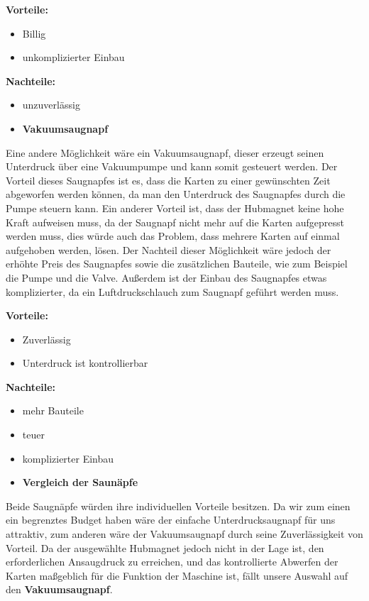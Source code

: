 \textbf{Vorteile:}
\begin{itemize}
    \item Billig
    \item unkomplizierter Einbau
\end{itemize}
\textbf{Nachteile:}
\begin{itemize}
    \item unzuverlässig
\end{itemize}

\begin{itemize}
    \item \textbf{Vakuumsaugnapf}
\end{itemize}
Eine andere Möglichkeit wäre ein Vakuumsaugnapf, dieser erzeugt seinen Unterdruck über eine Vakuumpumpe und kann somit gesteuert werden. Der Vorteil dieses Saugnapfes ist es, dass die Karten zu einer gewünschten Zeit abgeworfen werden können, da man den
Unterdruck des Saugnapfes durch die Pumpe steuern kann. Ein anderer Vorteil ist, dass der Hubmagnet keine hohe Kraft aufweisen muss, da der Saugnapf nicht mehr auf die Karten aufgepresst werden muss, dies würde auch das Problem, dass mehrere Karten auf einmal
aufgehoben werden, lösen. Der Nachteil dieser Möglichkeit wäre jedoch der erhöhte Preis des Saugnapfes sowie die zusätzlichen Bauteile, wie zum Beispiel die Pumpe und die Valve. Außerdem ist der Einbau des Saugnapfes etwas komplizierter, da ein Luftdruckschlauch
zum Saugnapf geführt werden muss.

\textbf{Vorteile:}
\begin{itemize}
    \item Zuverlässig
    \item Unterdruck ist kontrollierbar
\end{itemize}
\textbf{Nachteile:}
\begin{itemize}
    \item mehr Bauteile
    \item teuer
    \item komplizierter Einbau
\end{itemize}

\begin{itemize}
    \item \textbf{Vergleich der Saunäpfe}
\end{itemize}

Beide Saugnäpfe würden ihre individuellen Vorteile besitzen. Da wir zum einen ein begrenztes Budget haben wäre der einfache Unterdrucksaugnapf für uns attraktiv, zum anderen wäre der Vakuumsaugnapf durch seine Zuverlässigkeit von Vorteil.
Da der ausgewählte Hubmagnet jedoch nicht in der Lage ist, den erforderlichen Ansaugdruck zu erreichen, und das kontrollierte Abwerfen der Karten maßgeblich für die Funktion der Maschine ist, fällt unsere Auswahl auf den \textbf{Vakuumsaugnapf}.
